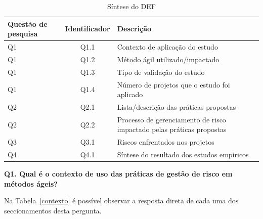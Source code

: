 \documentclass[
	12pt,
	openright,
	twoside,
	a4paper,
	english,
	brazil
	]{abntex2}
\begin{document}
\begin{table}[h!]
  \centering
  \caption{Síntese do DEF}
  \begin{tabular}{|p{2.4cm}|c|p{9.5cm}|}
  \hline
  \textbf{Questão de pesquisa} & \textbf{Identificador} & \textbf{Descrição} \\ \hline
  Q1 & Q1.1 & Contexto de aplicação do estudo \\ \hline
  Q1 & Q1.2 & Método ágil utilizado/impactado \\ \hline
  Q1 & Q1.3 & Tipo de validação do estudo \\ \hline
  Q1 & Q1.4 & Número de projetos que o estudo foi aplicado \\ \hline
  Q2 & Q2.1 & Lista/descrição das práticas propostas \\ \hline
  Q2 & Q2.2 & Processo de gerenciamento de risco impactado pelas práticas propostas \\ \hline
  Q3 & Q3.1 & Riscos enfrentados nos projetos \\ \hline
  Q4 & Q4.1 & Síntese do resultado dos estudos empíricos \\ \hline
  \end{tabular}
  \label{sintese}
\end{table}

\textbf{Q1. Qual é o contexto de uso das práticas de gestão de risco em métodos ágeis?}

Na Tabela~\ref{contexto} é possível observar a resposta direta de cada uma dos seccionamentos desta pergunta.
\end{document}
